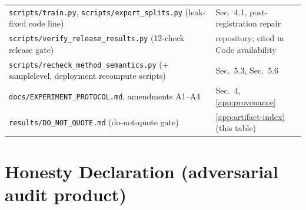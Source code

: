 \documentclass[final,5p,times,nonatbib]{elsarticle}
\begin{document}
\begin{table}[tb]
\begin{tabular}{p{}p{}}
\texttt{scripts/train.py}, \texttt{scripts/export\_splits.py} (leak-fixed code line) & Sec.~4.1, post-registration repair \\
\texttt{scripts/verify\_release\_results.py} (12-check release gate) & repository; cited in Code availability \\
\texttt{scripts/recheck\_method\_semantics.py} (+ samplelevel, deployment recompute scripts) & Sec.~5.3, Sec.~5.6 \\
\texttt{docs/EXPERIMENT\_PROTOCOL.md}, amendments A1--A4 & Sec.~4, \ref{app:provenance} \\
\texttt{results/DO\_NOT\_QUOTE.md} (do-not-quote gate) & \ref{app:artifact-index} (this table) \\
\bottomrule
\end{tabular}
\end{table}
\section{Honesty Declaration (adversarial audit product)}
\label{sec:honesty}
\end{document}
